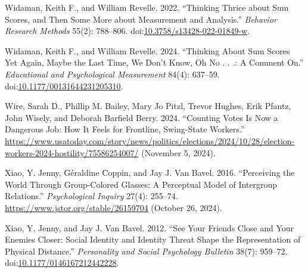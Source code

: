 \documentclass[
  12pt,
  letterpaper,
]{article}
\newlength{\cslhangindent}
\newenvironment{CSLReferences}[2] %
 {\begin{list}{}{%
  \setlength{\itemindent}{0pt}
  \setlength{\leftmargin}{0pt}
  \setlength{\parsep}{0pt}
  \ifodd #1
   \setlength{\leftmargin}{\cslhangindent}
   \setlength{\itemindent}{-1\cslhangindent}
  \fi
  \setlength{\itemsep}{#2\baselineskip}}}
 {\end{list}}
\begin{document}
\begin{CSLReferences}{1}{1}
Widaman, Keith F., and William Revelle. 2022. {``Thinking Thrice about
Sum Scores, and Then Some More about Measurement and Analysis.''}
\emph{Behavior Research Methods} 55(2): 788--806.
doi:\href{https://doi.org/10.3758/s13428-022-01849-w}{10.3758/s13428-022-01849-w}.

Widaman, Keith F., and William Revelle. 2024. {``Thinking {About Sum
Scores Yet Again}, {Maybe} the {Last Time}, {We Don}'t {Know}, {Oh No} .
. .: {A Comment} On.''} \emph{Educational and Psychological Measurement}
84(4): 637--59.
doi:\href{https://doi.org/10.1177/00131644231205310}{10.1177/00131644231205310}.

Wire, Sarah D., Phillip M. Bailey, Mary Jo Pitzl, Trevor Hughes, Erik
Pfantz, John Wisely, and Deborah Barfield Berry. 2024. {``Counting Votes
Is Now a Dangerous Job: How It Feels for Frontline, Swing-State
Workers.''}
\url{https://www.usatoday.com/story/news/politics/elections/2024/10/28/election-workers-2024-hostility/75586254007/}
(November 5, 2024).

Xiao, Y. Jenny, Géraldine Coppin, and Jay J. Van Bavel. 2016.
{``Perceiving the {World Through Group-Colored Glasses}: {A Perceptual
Model} of {Intergroup Relations}.''} \emph{Psychological Inquiry} 27(4):
255--74. \url{https://www.jstor.org/stable/26159704} (October 26, 2024).

Xiao, Y. Jenny, and Jay J. Van Bavel. 2012. {``See {Your Friends Close}
and {Your Enemies Closer}: {Social Identity} and {Identity Threat Shape}
the {Representation} of {Physical Distance}.''} \emph{Personality and
Social Psychology Bulletin} 38(7): 959--72.
doi:\href{https://doi.org/10.1177/0146167212442228}{10.1177/0146167212442228}.

\end{CSLReferences}
\end{document}
